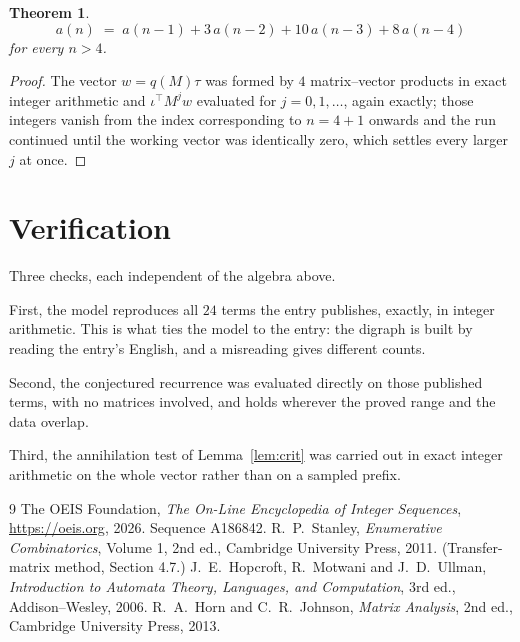 \documentclass[11pt,a4paper]{article}
\theoremstyle{plain}
\newtheorem{theorem}{Theorem}
\theoremstyle{definition}
\begin{document}
\begin{theorem}
\[
a(n)\;=\;a(n-1) + 3\,a(n-2) + 10\,a(n-3) + 8\,a(n-4)
\]
for every $n>4$.
\end{theorem}

\begin{proof}
The vector $w=q(M)\tau$ was formed by $4$ matrix--vector products in exact integer
arithmetic and $\iota^{\!\top}M^{j}w$ evaluated for $j=0,1,\dots$, again exactly; those
integers vanish from the index corresponding to $n=4+1$ onwards and the run continued
until the working vector was identically zero, which settles every larger $j$ at once.
\end{proof}

\section{Verification}

Three checks, each independent of the algebra above.

First, the model reproduces all $24$ terms the entry publishes, exactly, in integer
arithmetic. This is what ties the model to the entry: the digraph is built by reading the
entry's English, and a misreading gives different counts.

Second, the conjectured recurrence was evaluated directly on those published terms, with no
matrices involved, and holds wherever the proved range and the data overlap.

Third, the annihilation test of Lemma~\ref{lem:crit} was carried out in exact integer
arithmetic on the whole vector rather than on a sampled prefix.

\begin{thebibliography}{9}
 The OEIS Foundation, \emph{The On-Line Encyclopedia of Integer
Sequences}, \url{https://oeis.org}, 2026. Sequence A186842.
 R.~P.~Stanley, \emph{Enumerative Combinatorics}, Volume 1, 2nd ed.,
Cambridge University Press, 2011. (Transfer-matrix method, Section 4.7.)
 J.~E.~Hopcroft, R.~Motwani and J.~D.~Ullman, \emph{Introduction to Automata
Theory, Languages, and Computation}, 3rd ed., Addison--Wesley, 2006.
 R.~A.~Horn and C.~R.~Johnson, \emph{Matrix Analysis}, 2nd ed., Cambridge
University Press, 2013.
\end{thebibliography}
\end{document}
